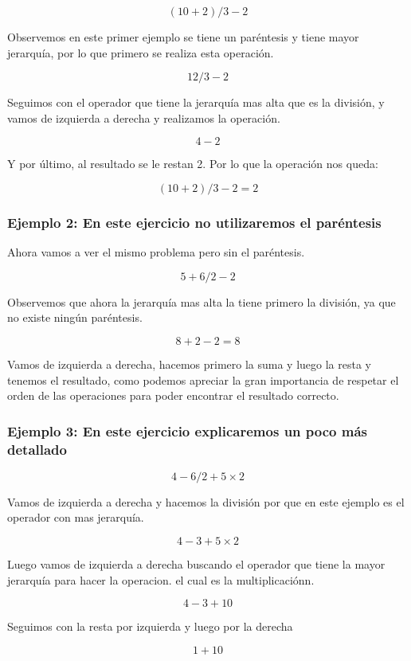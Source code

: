 \documentclass[11pt]{book}
\begin{document}
\[( 10 + 2 ) / 3 - 2\]

Observemos en este primer ejemplo se tiene un paréntesis y tiene mayor jerarquía, por lo que primero se realiza esta operación.

\[12 / 3 - 2\]

Seguimos con el operador que tiene la jerarquía mas alta que es la división, y vamos de izquierda a derecha y realizamos la operación.

\[4 - 2\]

Y por último, al resultado se le restan 2. Por lo que la operación nos queda:

\[( 10 + 2 ) / 3 - 2 = 2\]



\subsubsection{Ejemplo 2: En este ejercicio no utilizaremos el paréntesis}


Ahora vamos a ver el mismo problema pero sin el paréntesis.

\[5 + 6 / 2 - 2\]

Observemos que ahora la jerarquía mas alta la tiene primero la división, ya que no existe ningún paréntesis.

\[8 + 2 - 2 = 8\]

Vamos de izquierda a derecha, hacemos primero la suma y luego la resta y tenemos el resultado, como podemos apreciar la gran importancia de respetar el orden de las operaciones para poder encontrar el resultado correcto.


\subsubsection{Ejemplo 3: En este ejercicio explicaremos un poco más detallado}

\[4 - 6 / 2 + 5 \times 2\]

Vamos de izquierda a derecha y hacemos la división por que en este ejemplo es el operador con mas jerarquía.

\[4 - 3 + 5 \times 2\]

Luego vamos de izquierda a derecha buscando el operador que tiene la mayor jerarquía para hacer la operacion. el cual es la multiplicaciónn.

\[4 - 3 + 10\]

Seguimos con la resta por izquierda y luego por la derecha

\[1 + 10\]
\end{document}

